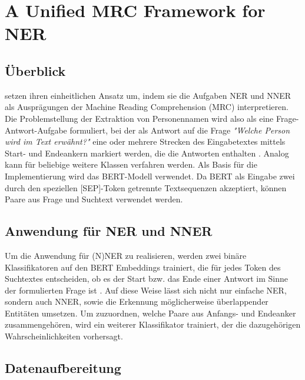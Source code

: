 

\chapter{A Unified MRC Framework for NER}
\label{ch:MRC}


\section{Überblick}
\label{ch:MRC:sec:Überblick}

\cite{li2019unified} setzen ihren einheitlichen Ansatz um, indem sie die Aufgaben NER und NNER als Ausprägungen der Machine Reading Comprehension (MRC) interpretieren. Die Problemstellung der Extraktion von Personennamen wird also als eine Frage-Antwort-Aufgabe formuliert, bei der als Antwort auf die Frage \emph{"Welche Person wird im Text erwähnt?"} eine oder mehrere Strecken des Eingabetextes mittels Start- und Endeankern markiert werden, die die Antworten enthalten \parencite[1]{li2019unified}. Analog kann für beliebige weitere Klassen verfahren werden. Als Basis für die Implementierung wird das BERT-Modell \parencite{devlin2019bert} verwendet. Da BERT als Eingabe zwei durch den speziellen [SEP]-Token getrennte Textsequenzen akzeptiert, können Paare aus Frage und Suchtext verwendet werden.

\section{Anwendung für NER und NNER}
\label{ch:MRC:sec:AnwendungNERNNER}

Um die Anwendung für (N)NER zu realisieren, werden zwei binäre Klassifikatoren auf den BERT Embeddings trainiert, die für jedes Token des Suchtextes entscheiden, ob es der Start bzw. das Ende einer Antwort im Sinne der formulierten Frage ist \parencite[4]{li2019unified}. Auf diese Weise lässt sich nicht nur einfache NER, sondern auch NNER, sowie die Erkennung möglicherweise überlappender Entitäten umsetzen. Um zuzuordnen, welche Paare aus Anfangs- und Endeanker zusammengehören, wird ein weiterer Klassifikator trainiert, der die dazugehörigen Wahrscheinlichkeiten vorhersagt.

\section{Datenaufbereitung}
\label{ch:MRC:sec:Datenaufbereitung}

